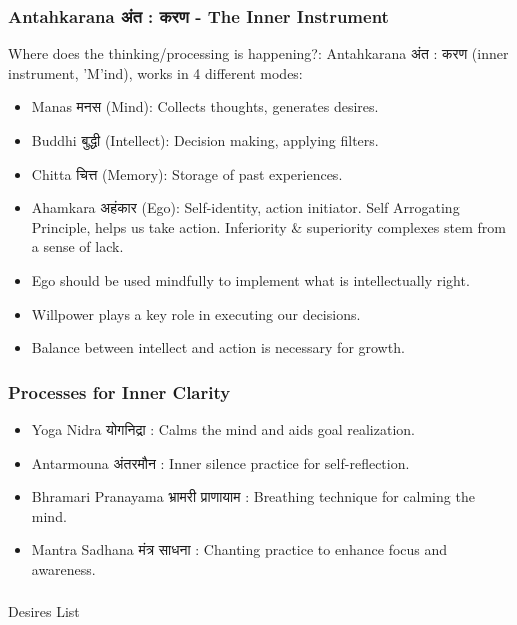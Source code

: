 \begin{frame}[fragile]\frametitle{Antahkarana अंत : करण - The Inner Instrument}

Where does the thinking/processing is happening?: Antahkarana अंत : करण (inner instrument, 'M'ind), works in 4 different modes:
      \begin{itemize}
        \item Manas मनस (Mind): Collects thoughts, generates desires.
        \item Buddhi बुद्धी (Intellect): Decision making, applying filters.
        \item Chitta चित्त (Memory): Storage of past experiences.
        \item Ahamkara अहंकार (Ego): Self-identity, action initiator. Self Arrogating Principle, helps us take action. Inferiority \& superiority complexes stem from a sense of lack. 
        \item Ego should be used mindfully to implement what is intellectually right.
        \item Willpower plays a key role in executing our decisions.
        \item Balance between intellect and action is necessary for growth.
      \end{itemize}
\end{frame}

\begin{frame}[fragile]\frametitle{Processes for Inner Clarity}
      \begin{itemize}
        \item Yoga Nidra योगनिद्रा : Calms the mind and aids goal realization.
        \item Antarmouna अंतरमौन : Inner silence practice for self-reflection.
        \item Bhramari Pranayama भ्रामरी प्राणायाम : Breathing technique for calming the mind.
        \item Mantra Sadhana मंत्र साधना : Chanting practice to enhance focus and awareness.
      \end{itemize}
\end{frame}

\begin{frame}[fragile]\frametitle{}
\begin{center}
{\Large Desires List}
\end{center}
\end{frame}

